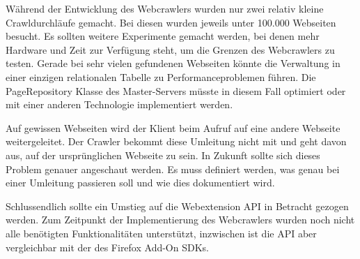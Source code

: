 Während der Entwicklung des Webcrawlers wurden nur zwei relativ kleine Crawldurchläufe gemacht. Bei diesen wurden jeweils unter 100.000 Webseiten besucht. Es sollten weitere Experimente gemacht werden, bei denen mehr Hardware und Zeit zur Verfügung steht, um die Grenzen des Webcrawlers zu testen. Gerade bei sehr vielen gefundenen Webseiten könnte die Verwaltung in einer einzigen relationalen Tabelle zu Performanceproblemen führen. Die PageRepository Klasse des Master-Servers müsste in diesem Fall optimiert oder mit einer anderen Technologie implementiert werden. 

Auf gewissen Webseiten wird der Klient beim Aufruf auf eine andere Webseite weitergeleitet. Der Crawler bekommt diese Umleitung nicht mit und geht davon aus, auf der ursprünglichen Webseite zu sein. In Zukunft sollte sich dieses Problem genauer angeschaut werden. Es muss definiert werden, was genau bei einer Umleitung passieren soll und wie dies dokumentiert wird.

Schlussendlich sollte ein Umstieg auf die Webextension API in Betracht gezogen werden. Zum Zeitpunkt der Implementierung des Webcrawlers wurden noch nicht alle benötigten Funktionalitäten unterstützt, inzwischen ist die API aber vergleichbar mit der des Firefox Add-On SDKs.




